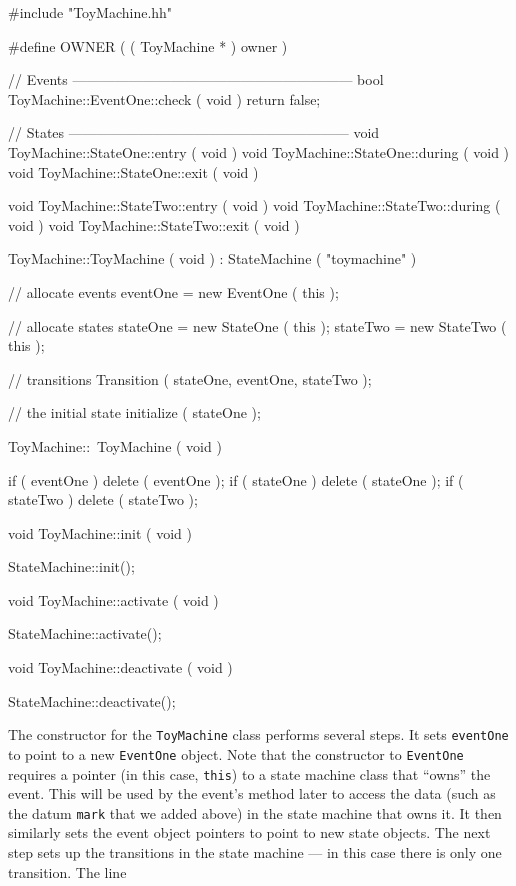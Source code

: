 \begin{codesegment}
  #include "ToyMachine.hh"

  #define OWNER ( ( ToyMachine * ) owner )

  // Events ------------------------------------------------------------
  bool ToyMachine::EventOne::check ( void ) { return false; }

  // States ------------------------------------------------------------
  void ToyMachine::StateOne::entry ( void ) {}
  void ToyMachine::StateOne::during ( void ) {}
  void ToyMachine::StateOne::exit ( void ) {}

  void ToyMachine::StateTwo::entry ( void ) {}
  void ToyMachine::StateTwo::during ( void ) {}
  void ToyMachine::StateTwo::exit ( void ) {}

  ToyMachine::ToyMachine ( void ) : StateMachine ( "toymachine" ) {

    // allocate events
    eventOne = new EventOne ( this );

    // allocate states
    stateOne = new StateOne ( this );
    stateTwo = new StateTwo ( this );

    // transitions
    Transition ( stateOne, eventOne, stateTwo );

    // the initial state
    initialize ( stateOne );

  } 

  ToyMachine::~ToyMachine ( void ) {

    if ( eventOne ) delete ( eventOne );
    if ( stateOne ) delete ( stateOne );
    if ( stateTwo ) delete ( stateTwo );

  }
 
  void ToyMachine::init ( void ) {

    StateMachine::init();

  }

  void ToyMachine::activate ( void ) {

    StateMachine::activate();

  }

  void ToyMachine::deactivate ( void ) {

    StateMachine::deactivate();

  }

\end{codesegment}

The constructor for the {\tt ToyMachine} class performs several steps. It sets
{\tt eventOne} to point to a new {\tt EventOne} object. Note that the
constructor to {\tt EventOne} requires a pointer (in this case, {\tt this}) to a
state machine class that ``owns'' the event. This will be used by the event's
method later to access the data (such as the datum {\tt mark} that we added
above) in the state machine that owns it. It then similarly sets the event
object pointers to point to new state objects. The next step sets up the
transitions in the state machine --- in this case there is only one
transition. The line

